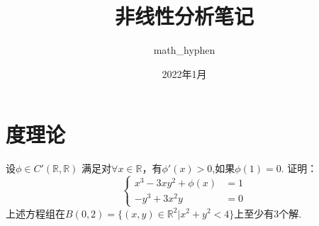 \documentclass[a4,10pt]{ctexart}
\begin{document}
\title{非线性分析笔记}
\author{math\_hyphen}
\date{2022年1月}
\maketitle
\tableofcontents
\newpage
{}
\newpage



\section{度理论}

\begin{lt}
    设$\phi\in{C'(\mathbb{R},\mathbb{R})}$ 满足对$\forall{x}\in{\mathbb{R}}$，有$\phi'(x)>0$,如果$\phi(1)=0$. 证明：
    \begin{equation}
      \left\{\begin{aligned}
      x^3-3xy^2+\phi(x) &= 1\\
      -y^3 + 3x^2y &=0
      \end{aligned}\right.  \label{a}
    \end{equation}
    上述方程组在$B(0,2)=\{(x,y)\in{\mathbb{R}^2}|x^2+y^2<4\}$上至少有3个解.
\end{lt}
  
\end{document}
